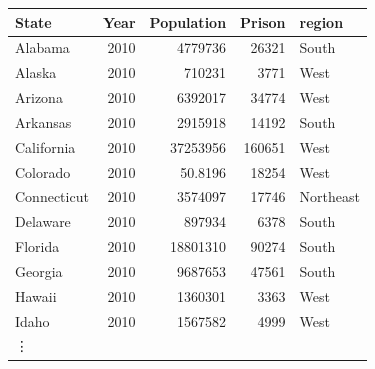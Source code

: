 \documentclass[letterpaper, landscape]{article}
\begin{document}
  \begin{table}[H]
    \centering
    \begin{tabular}{lrrrl}
      \toprule
      State       & Year & Population & Prison & region    \\
      \midrule
      Alabama     & 2010   & 4779736  & 26321  & South     \\
      Alaska      & 2010   & 710231   & 3771   & West      \\
      Arizona     & 2010   & 6392017  & 34774  & West      \\
      Arkansas    & 2010   & 2915918  & 14192  & South     \\
      California  & 2010   & 37253956 & 160651 & West      \\
      Colorado    & 2010   & 50.8196  & 18254  & West      \\
      Connecticut & 2010   & 3574097  & 17746  & Northeast \\
      Delaware    & 2010   & 897934   & 6378   & South     \\
      Florida     & 2010   & 18801310 & 90274  & South     \\
      Georgia     & 2010   & 9687653  & 47561  & South     \\
      Hawaii      & 2010   & 1360301  & 3363   & West      \\
      Idaho       & 2010   & 1567582  & 4999   & West      \\
      \vdots      \\

\end{tabular}
\end{table}
\end{document}
